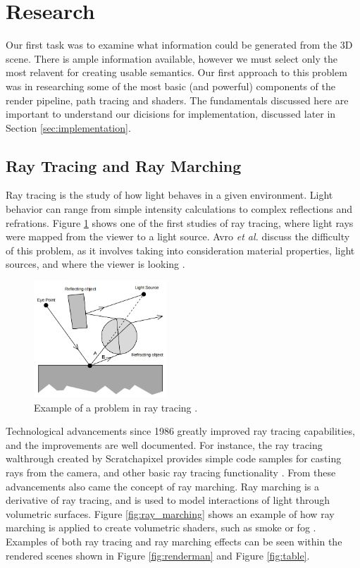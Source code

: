 \documentclass[conference]{IEEEtran}
\begin{document}
\section{Research}
Our first task was to examine what information could be generated
from the 3D scene.
There is ample information available, however we must
select only the most relavent for creating usable semantics.
Our first approach to this problem was in researching some of the most basic
(and powerful) components of the render pipeline, path tracing and shaders.
The fundamentals discussed here are important to understand our dicisions
for implementation, discussed later in Section \ref{sec:implementation}.

\subsection{Ray Tracing and Ray Marching}
Ray tracing is the study of how light behaves in a given environment.
Light behavior can range from simple intensity calculations to complex
reflections and refrations.
Figure \ref{fig:raytrace}
shows one of the first studies of ray tracing, where light rays were mapped from
the viewer to a light source. Avro \textit{et al.}
discuss the difficulty of this problem,
as it involves taking into consideration material properties, light sources,
and where the viewer is looking \cite{backwards_raytrace}.

\begin{figure}[htbp]
\centerline{\includegraphics[width=5cm]{raytrace.png}}
\caption{Example of a problem in ray tracing \cite{backwards_raytrace}.}
\label{fig:raytrace}
\end{figure}

Technological advancements since 1986 greatly improved ray tracing capabilities,
and the improvements are well documented.
For instance, the ray tracing walthrough created by Scratchapixel 
provides simple code samples for casting rays from the camera, and other basic ray tracing
functionality \cite{raytrace_walkthrough}.
From these advancements also came the concept of ray marching.
Ray marching is a derivative of ray tracing, and is used to model interactions
of light through volumetric surfaces.
Figure \ref{fig:ray_marching} shows an example of how ray marching is applied to
create volumetric shaders, such as smoke or fog \cite{ray_marching}.
Examples of both ray tracing and ray marching effects
can be seen within the rendered scenes shown in Figure \ref{fig:renderman}
and Figure \ref{fig:table}.
\end{document}
